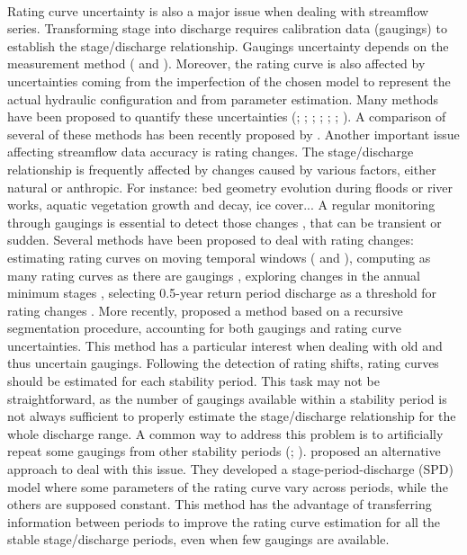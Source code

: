 \documentclass[11pt]{article}
\begin{document}
    \paragraph{}
    Rating curve uncertainty is also a major issue when dealing with streamflow series. Transforming stage into discharge requires calibration data (gaugings) to establish the stage/discharge relationship. Gaugings uncertainty depends on the measurement method (\citet{lecoz_quantification_2014} and \citet{puechberty_charte_2017}). Moreover, the rating curve is also affected by uncertainties coming from the imperfection of the chosen model to represent the actual hydraulic configuration and from parameter estimation. Many methods have been proposed to quantify these uncertainties (\citet{petersen-overleir_bayesian_2009}; \citet{juston_rating_2014}; \citet{le_coz_combining_2014}; \citet{morlot_dynamic_2014}; \citet{coxon_novel_2015}; \citet{mcmillan_rating_2015}; \citet{mansanarez_rapid_2019}). A comparison of several of these methods has been recently proposed by \citet{kiang_comparison_2018}. Another important issue affecting streamflow data accuracy is rating changes. The stage/discharge relationship is frequently affected by changes caused by various factors, either natural or anthropic. For instance: bed geometry evolution during floods or river works, aquatic vegetation growth and decay, ice cover... A regular monitoring through gaugings is essential to detect those changes \citep{ibbitt_gauging_1987}, that can be transient or sudden. Several methods have been proposed to deal with rating changes: estimating rating curves on moving temporal windows (\citet{westerberg_stage-discharge_2011} and \citet{guerrero_temporal_2012}), computing as many rating curves as there are gaugings \citep{morlot_dynamic_2014}, exploring changes in the annual minimum stages \citep{lapuszek_methods_2015}, selecting 0.5-year return period discharge as a threshold for rating changes \citep{mcmillan_impacts_2010}. More recently, \citet{darienzo_detection_2021} proposed a method based on a recursive segmentation procedure, accounting for both gaugings and rating curve uncertainties. This method has a particular interest when dealing with old and thus uncertain gaugings. Following the detection of rating shifts, rating curves should be estimated for each stability period. This task may not be straightforward, as the number of gaugings available within a stability period is not always sufficient to properly estimate the stage/discharge relationship for the whole discharge range. A common way to address this problem is to artificially repeat some gaugings from other stability periods (\citet{mcmillan_benchmarking_2012}; \citet{puechberty_charte_2017}). \citet{mansanarez_shift_2019} proposed an alternative approach to deal with this issue. They developed a stage-period-discharge (SPD) model where some parameters of the rating curve vary across periods, while the others are supposed constant. This method has the advantage of transferring information between periods to improve the rating curve estimation for all the stable stage/discharge periods, even when few gaugings are available.
    
\end{document}
